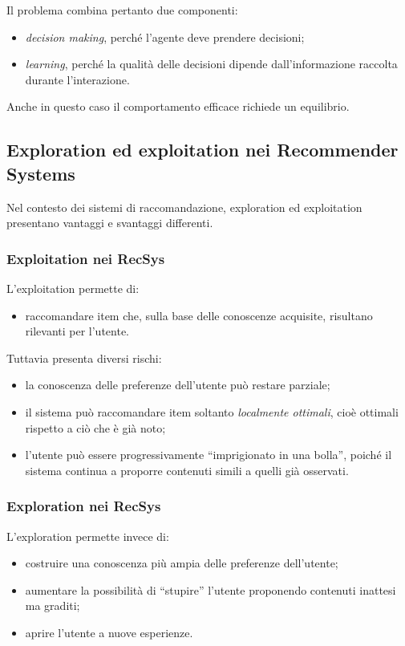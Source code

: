 Il problema combina pertanto due componenti:
\begin{itemize}
    \item \emph{decision making}, perché l'agente deve prendere decisioni;
    \item \emph{learning}, perché la qualità delle decisioni dipende dall'informazione raccolta durante l'interazione.
\end{itemize}


Anche in questo caso il comportamento efficace richiede un equilibrio.

\subsection{Exploration ed exploitation nei Recommender Systems}

Nel contesto dei sistemi di raccomandazione, exploration ed exploitation presentano vantaggi e svantaggi differenti.

\subsubsection{Exploitation nei RecSys}

L'exploitation permette di:
\begin{itemize}
    \item raccomandare item che, sulla base delle conoscenze acquisite, risultano rilevanti per l'utente.
\end{itemize}

Tuttavia presenta diversi rischi:
\begin{itemize}
    \item la conoscenza delle preferenze dell'utente può restare parziale;
    \item il sistema può raccomandare item soltanto \emph{localmente ottimali}, cioè ottimali rispetto a ciò che è già noto;
    \item l'utente può essere progressivamente ``imprigionato in una bolla'', poiché il sistema continua a proporre contenuti simili a quelli già osservati.
\end{itemize}

\subsubsection{Exploration nei RecSys}

L'exploration permette invece di:
\begin{itemize}
    \item costruire una conoscenza più ampia delle preferenze dell'utente;
    \item aumentare la possibilità di ``stupire'' l'utente proponendo contenuti inattesi ma graditi;
    \item aprire l'utente a nuove esperienze.
\end{itemize}

